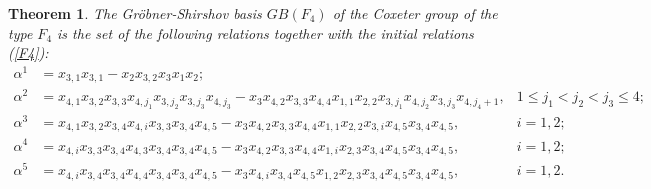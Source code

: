 \documentclass[UTF8]{amsart}
\newtheorem{theorem}[tpcl]{Theorem}
\theoremstyle{definition}
\theoremstyle{remark}
\numberwithin{equation}{section}
\begin{document}
\begin{theorem}
The Gr\"{o}bner-Shirshov basis $GB(F_4)$ of the Coxeter group of the type $F_4$ is the set of  the  following relations together with the initial relations (\ref{F4}):
\begin{align*}
	\alpha^1&=x_{3,1}x_{3,1}-x_2x_{3,2}x_3x_1x_2;&\\
	\alpha^2&=x_{4,1}x_{3,2}x_{3,3}x_{4,j_1}x_{3,j_2}x_{3,j_3}x_{4,j_3}-x_3x_{4,2}x_{3,3}x_{4,4}x_{1,1}x_{2,2}x_{3,j_1}x_{4,j_2}x_{3,j_3}x_{4,j_4+1},
&1\leq  j_1<j_2<j_3\leq 4;\\
\alpha^3&=x_{4,1}x_{3,2}x_{3,4}x_{4,i}x_{3,3}x_{3,4}x_{4,5}-x_3x_{4,2}x_{3,3}x_{4,4}x_{1,1}x_{2,2}x_{3,i}x_{4,5}x_{3,4}x_{4,5},&i=1,2;\\
	\alpha^4&=x_{4,i}x_{3,3}x_{3,4}x_{4,3}x_{3,4}x_{3,4}x_{4,5}-x_3x_{4,2}x_{3,3}x_{4,4}x_{1,i}x_{2,3}x_{3,4}x_{4,5}x_{3,4}x_{4,5},&i=1,2;\\
	\alpha^5&=x_{4,i}x_{3,4}x_{3,4}x_{4,4}x_{3,4}x_{3,4}x_{4,5}-x_3x_{4,i}x_{3,4}x_{4,5}x_{1,2}x_{2,3}x_{3,4}x_{4,5}x_{3,4}x_{4,5},&i=1,2.\\
\end{align*}
\end{theorem}
\end{document}
